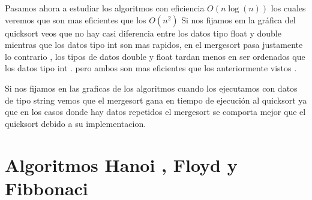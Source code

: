 \documentclass[11pt,openany]{book}
\begin{document}
Pasamos ahora a estudiar los algoritmos con eficiencia \(O(n\log(n))\) los cuales veremos que son mas eficientes que los \(O(n^2)\)
Si nos fijamos em la gráfica del quicksort veos que no hay casi diferencia entre los datos tipo float y double mientras que los datos tipo int son mas rapidos,
en el mergesort pasa justamente lo contrario , los tipos de datos double y float tardan menos en ser ordenados que los datos tipo int .
pero ambos son mas eficientes que los anteriormente vistos .

Si nos fijamos en las graficas de los algoritmos cuando los ejecutamos con datos de tipo string vemos que el mergesort gana en tiempo de ejecución al
quicksort ya que en los casos donde hay datos repetidos el mergesort se comporta mejor que el quicksort debido a su implementacion.

\section{Algoritmos Hanoi , Floyd y Fibbonaci}
\end{document}
